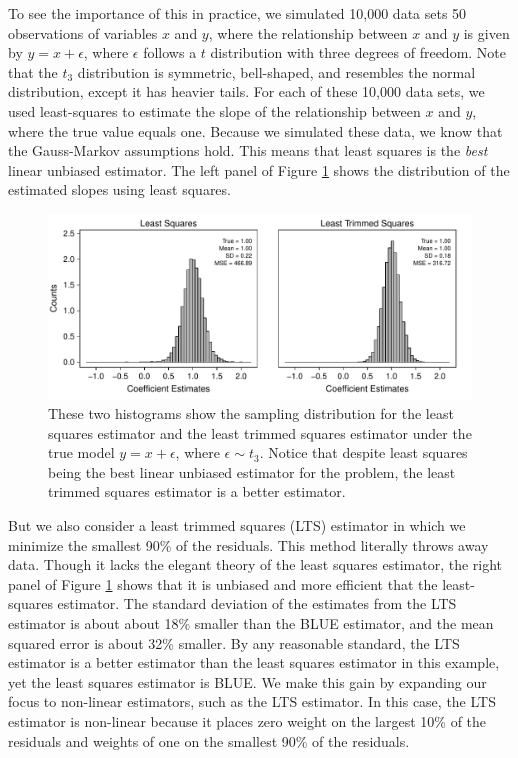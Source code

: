 \documentclass[12pt]{article}
\begin{document}
To see the importance of this in practice, we simulated 10,000 data sets 50 observations of variables $x$ and $y$, where the relationship between $x$ and $y$ is given by $y = x + \epsilon$, where $\epsilon$ follows a $t$ distribution with three degrees of freedom. 
Note that the $t_3$ distribution is symmetric, bell-shaped, and resembles the normal distribution, except it has heavier tails. 
For each of these 10,000 data sets, we used least-squares to estimate the slope of the relationship between $x$ and $y$, where the true value equals one. 
Because we simulated these data, we know that the Gauss-Markov assumptions hold. 
This means that least squares is the \textit{best} linear unbiased estimator. 
The left panel of Figure \ref{fig:lts-illustration} shows the distribution of the estimated slopes using least squares.

\begin{figure}[h!]
\begin{center}
\includegraphics[scale = .7]{figs/lts-illustration.pdf}
\caption{These two histograms show the sampling distribution for the least squares estimator and the least trimmed squares estimator under the true model $y = x + \epsilon$, where $\epsilon \sim t_3$. 
Notice that despite least squares being the best linear unbiased estimator for the problem, the least trimmed squares estimator is a better estimator.}\label{fig:lts-illustration}
\end{center}
\end{figure}

But we also consider a least trimmed squares (LTS) estimator in which we minimize the smallest 90\% of the residuals. 
This method literally throws away data. 
Though it lacks the elegant theory of the least squares estimator, the right panel of Figure \ref{fig:lts-illustration} shows that it is unbiased and more efficient that the least-squares estimator. 
The standard deviation of the estimates from the LTS estimator is about about 18\% smaller than the BLUE estimator, and the mean squared error is about 32\% smaller. 
By any reasonable standard, the LTS estimator is a better estimator than the least squares estimator in this example, yet the least squares estimator is BLUE. 
We make this gain by expanding our focus to non-linear estimators, such as the LTS estimator. 
In this case, the LTS estimator is non-linear because it places zero weight on the largest 10\% of the residuals and weights of one on the smallest 90\% of the residuals.
\end{document}
